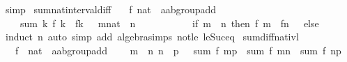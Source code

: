 \begin{isabellebody}
\ simp%
\endisatagproof
{\isafoldproof}%
%
\isadelimproof
\isanewline
%
\endisadelimproof
\isanewline
{}\isamarkupfalse%
\ sum{\isacharunderscore}{\kern0pt}natinterval{\isacharunderscore}{\kern0pt}diff{\isacharcolon}{\kern0pt}\isanewline
\ \ \ f{\isacharcolon}{\kern0pt}{\isacharcolon}{\kern0pt}\ {\isachardoublequoteopen}nat\ {\isasymRightarrow}\ {\isacharparenleft}{\kern0pt}{\isacharprime}{\kern0pt}a{\isacharcolon}{\kern0pt}{\isacharcolon}{\kern0pt}ab{\isacharunderscore}{\kern0pt}group{\isacharunderscore}{\kern0pt}add{\isacharparenright}{\kern0pt}{\isachardoublequoteclose}\isanewline
\ \ \ \ {\isachardoublequoteopen}sum\ {\isacharparenleft}{\kern0pt}{\isasymlambda}k{\isachardot}{\kern0pt}\ f\ k\ {\isacharminus}{\kern0pt}\ f{\isacharparenleft}{\kern0pt}k\ {\isacharplus}{\kern0pt}\ {}{\isacharparenright}{\kern0pt}{\isacharparenright}{\kern0pt}\ {\isacharbraceleft}{\kern0pt}{\isacharparenleft}{\kern0pt}m{\isacharcolon}{\kern0pt}{\isacharcolon}{\kern0pt}nat{\isacharparenright}{\kern0pt}\ {\isachardot}{\kern0pt}{\isachardot}{\kern0pt}\ n{\isacharbraceright}{\kern0pt}\ {\isacharequal}{\kern0pt}\isanewline
\ \ \ \ \ \ \ \ \ \ {\isacharparenleft}{\kern0pt}if\ m\ {\isasymle}\ n\ then\ f\ m\ {\isacharminus}{\kern0pt}\ f{\isacharparenleft}{\kern0pt}n\ {\isacharplus}{\kern0pt}\ {}{\isacharparenright}{\kern0pt}\ else\ {}{\isacharparenright}{\kern0pt}{\isachardoublequoteclose}\isanewline
%
\isadelimproof
%
\endisadelimproof
%
\isatagproof
{}\isamarkupfalse%
\ {\isacharparenleft}{\kern0pt}induct\ n{\isacharcomma}{\kern0pt}\ auto\ simp\ add{\isacharcolon}{\kern0pt}\ algebra{\isacharunderscore}{\kern0pt}simps\ not{\isacharunderscore}{\kern0pt}le\ le{\isacharunderscore}{\kern0pt}Suc{\isacharunderscore}{\kern0pt}eq{\isacharparenright}{\kern0pt}%
\endisatagproof
{\isafoldproof}%
%
\isadelimproof
\isanewline
%
\endisadelimproof
\isanewline
{}\isamarkupfalse%
\ sum{\isacharunderscore}{\kern0pt}diff{\isacharunderscore}{\kern0pt}nat{\isacharunderscore}{\kern0pt}ivl{\isacharcolon}{\kern0pt}\isanewline
\ \ \ f\ {\isacharcolon}{\kern0pt}{\isacharcolon}{\kern0pt}\ {\isachardoublequoteopen}nat\ {\isasymRightarrow}\ {\isacharprime}{\kern0pt}a{\isacharcolon}{\kern0pt}{\isacharcolon}{\kern0pt}ab{\isacharunderscore}{\kern0pt}group{\isacharunderscore}{\kern0pt}add{\isachardoublequoteclose}\isanewline
\ \ \ {\isachardoublequoteopen}{\isasymlbrakk}\ m\ {\isasymle}\ n{\isacharsemicolon}{\kern0pt}\ n\ {\isasymle}\ p\ {\isasymrbrakk}\ {\isasymLongrightarrow}\ sum\ f\ {\isacharbraceleft}{\kern0pt}m{\isachardot}{\kern0pt}{\isachardot}{\kern0pt}{\isacharless}{\kern0pt}p{\isacharbraceright}{\kern0pt}\ {\isacharminus}{\kern0pt}\ sum\ f\ {\isacharbraceleft}{\kern0pt}m{\isachardot}{\kern0pt}{\isachardot}{\kern0pt}{\isacharless}{\kern0pt}n{\isacharbraceright}{\kern0pt}\ {\isacharequal}{\kern0pt}\ sum\ f\ {\isacharbraceleft}{\kern0pt}n{\isachardot}{\kern0pt}{\isachardot}{\kern0pt}{\isacharless}{\kern0pt}p{\isacharbraceright}{\kern0pt}{\isachardoublequoteclose}\isanewline

\end{isabellebody}
